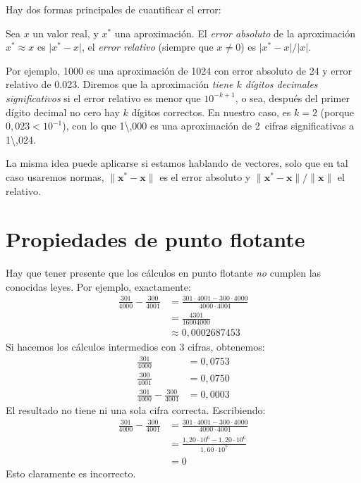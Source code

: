   Hay dos formas principales de cuantificar el error:
  \begin{definition}
    \label{def:error-computacional}
    Sea \(x\) un valor real,
    y \(x^*\) una aproximación.
    El \emph{error absoluto} de la aproximación \(x^* \approx x\)
    es \(\lvert x^* - x \rvert\),
    el \emph{error relativo} (siempre que \(x \ne 0\))
    es \(\lvert x^* - x \rvert / \lvert x \rvert\).
  \end{definition}
  Por ejemplo,
  \num{1000} es una aproximación de \num{1024} con error absoluto de \num{24}
  y error relativo de \num{0,023}.
  Diremos que la aproximación
  \emph{tiene \(k\) dígitos decimales significativos}
  si el error relativo es menor que \(10^{-k + 1}\),
  o sea,
  después del primer dígito decimal no cero hay \(k\) dígitos correctos.
  En nuestro caso,
  es \(k = 2\)
  (porque \(0,023 < 10^{-1}\)),
  con lo que \num{1\,000} es una aproximación de \num{2}~cifras significativas
  a \num{1\,024}.

  La misma idea puede aplicarse si estamos hablando de vectores,
  solo que en tal caso usaremos normas,
  \(\lVert \mathbf{x}^* - \mathbf{x} \rVert\) es el error absoluto
  y \(\lVert \mathbf{x}^* - \mathbf{x} \rVert / \lVert \mathbf{x} \rVert\)
  el relativo.

\section{Propiedades de punto flotante}
\label{sec:floating-point}

  Hay que tener presente que los cálculos en punto flotante
  \emph{no} cumplen las conocidas leyes.
  Por ejemplo,
  exactamente:
  \begin{align*}
    \frac{301}{4000} - \frac{300}{4001}
      &=       \frac{301 \cdot 4001 - 300 \cdot 4000}{4000 \cdot 4001} \\
      &=       \frac{4301}{16004000} \\
      &\approx 0,0002687453
  \end{align*}
  Si hacemos los cálculos intermedios con \num{3} cifras,
  obtenemos:
  \begin{align*}
    \frac{301}{4000}
      &= 0,0753 \\
    \frac{300}{4001}
      &= 0,0750 \\
    \frac{301}{4000} - \frac{300}{4001}
      &= 0,0003
  \end{align*}
  El resultado no tiene ni una sola cifra correcta.
  Escribiendo:
  \begin{align*}
    \frac{301}{4000} - \frac{300}{4001}
      &= \frac{301 \cdot 4001 - 300 \cdot 4000}{4000 \cdot 4001} \\
      &= \frac{1,20 \cdot 10^6 - 1,20 \cdot 10^6}{1,60 \cdot 10^7} \\
      &= 0
  \end{align*}
  Esto claramente es incorrecto.


